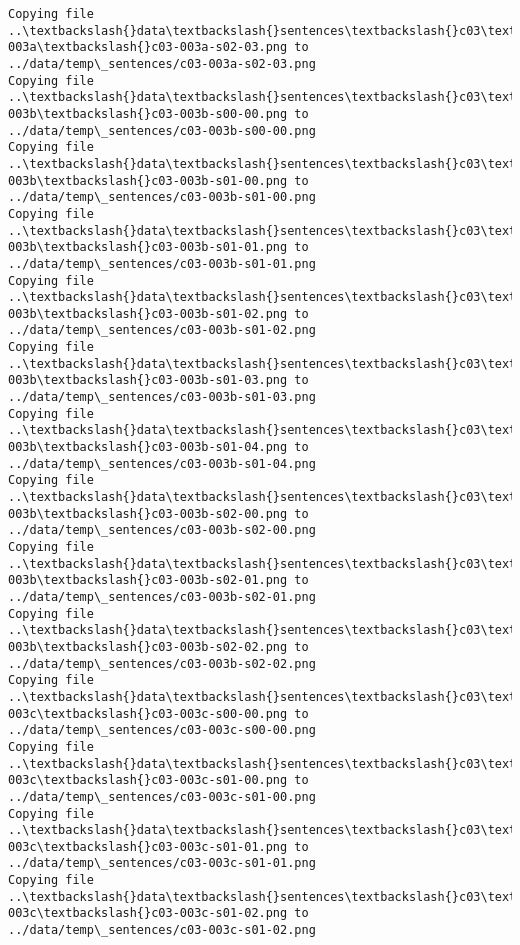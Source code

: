 \documentclass[11pt]{article}
\begin{document}
\begin{Verbatim}[commandchars=\\\{\}]
Copying file ..\textbackslash{}data\textbackslash{}sentences\textbackslash{}c03\textbackslash{}c03-003a\textbackslash{}c03-003a-s02-03.png to
../data/temp\_sentences/c03-003a-s02-03.png
Copying file ..\textbackslash{}data\textbackslash{}sentences\textbackslash{}c03\textbackslash{}c03-003b\textbackslash{}c03-003b-s00-00.png to
../data/temp\_sentences/c03-003b-s00-00.png
Copying file ..\textbackslash{}data\textbackslash{}sentences\textbackslash{}c03\textbackslash{}c03-003b\textbackslash{}c03-003b-s01-00.png to
../data/temp\_sentences/c03-003b-s01-00.png
Copying file ..\textbackslash{}data\textbackslash{}sentences\textbackslash{}c03\textbackslash{}c03-003b\textbackslash{}c03-003b-s01-01.png to
../data/temp\_sentences/c03-003b-s01-01.png
Copying file ..\textbackslash{}data\textbackslash{}sentences\textbackslash{}c03\textbackslash{}c03-003b\textbackslash{}c03-003b-s01-02.png to
../data/temp\_sentences/c03-003b-s01-02.png
Copying file ..\textbackslash{}data\textbackslash{}sentences\textbackslash{}c03\textbackslash{}c03-003b\textbackslash{}c03-003b-s01-03.png to
../data/temp\_sentences/c03-003b-s01-03.png
Copying file ..\textbackslash{}data\textbackslash{}sentences\textbackslash{}c03\textbackslash{}c03-003b\textbackslash{}c03-003b-s01-04.png to
../data/temp\_sentences/c03-003b-s01-04.png
Copying file ..\textbackslash{}data\textbackslash{}sentences\textbackslash{}c03\textbackslash{}c03-003b\textbackslash{}c03-003b-s02-00.png to
../data/temp\_sentences/c03-003b-s02-00.png
Copying file ..\textbackslash{}data\textbackslash{}sentences\textbackslash{}c03\textbackslash{}c03-003b\textbackslash{}c03-003b-s02-01.png to
../data/temp\_sentences/c03-003b-s02-01.png
Copying file ..\textbackslash{}data\textbackslash{}sentences\textbackslash{}c03\textbackslash{}c03-003b\textbackslash{}c03-003b-s02-02.png to
../data/temp\_sentences/c03-003b-s02-02.png
Copying file ..\textbackslash{}data\textbackslash{}sentences\textbackslash{}c03\textbackslash{}c03-003c\textbackslash{}c03-003c-s00-00.png to
../data/temp\_sentences/c03-003c-s00-00.png
Copying file ..\textbackslash{}data\textbackslash{}sentences\textbackslash{}c03\textbackslash{}c03-003c\textbackslash{}c03-003c-s01-00.png to
../data/temp\_sentences/c03-003c-s01-00.png
Copying file ..\textbackslash{}data\textbackslash{}sentences\textbackslash{}c03\textbackslash{}c03-003c\textbackslash{}c03-003c-s01-01.png to
../data/temp\_sentences/c03-003c-s01-01.png
Copying file ..\textbackslash{}data\textbackslash{}sentences\textbackslash{}c03\textbackslash{}c03-003c\textbackslash{}c03-003c-s01-02.png to
../data/temp\_sentences/c03-003c-s01-02.png

\end{Verbatim}
\end{document}
